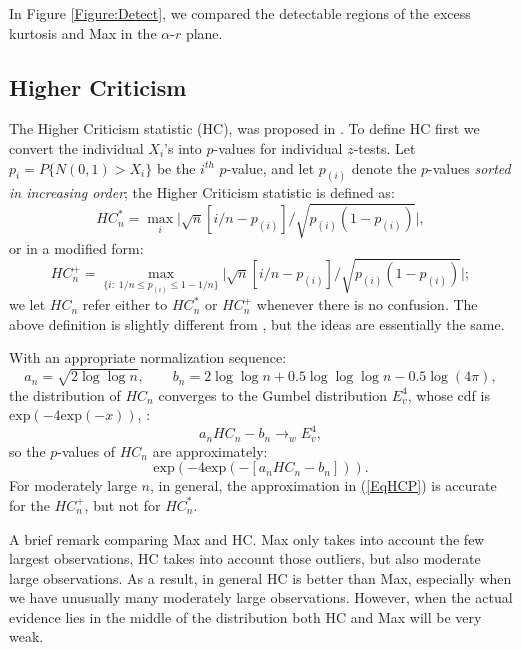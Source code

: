 In Figure \ref{Figure:Detect}, we compared the detectable regions of the excess kurtosis and Max in the $\alpha$-$r$ plane. 

\subsection{Higher Criticism}
\label{sec:HC}

The Higher Criticism statistic (HC), was proposed in \cite{gauss:lin02}. To define HC first we convert the individual $X_i$'s 
into $p$-values for individual $z$-tests. Let $p_i = P\{ N(0,1) > X_i \}$ be the $i^{th}$ $p$-value, and let $p_{(i)}$ denote 
the $p$-values {\it sorted in increasing order}; the Higher Criticism statistic is defined as:
\[
       HC_{n}^* =  \max_{i}
         \biggl| \sqrt{n} [i/n  - p_{(i)}]/ \sqrt{p_{(i)} (1-p_{(i)})} \biggr|,
\]
or in a modified form:
\[
HC_n^+  = \max_{\{i:  \; 1/n  \leq  p_{(i)} \leq  1 - 1/n \}}
         \biggl|   \sqrt{n} [i/n  - p_{(i)}]/ \sqrt{p_{(i)} (1-p_{(i)})}  \biggr|;
\]
we let $HC_n$ refer either to $HC_n^*$ or $HC_n^+$ whenever there is no confusion. The above definition is slightly 
different from \cite{gauss:lin02}, but the ideas are essentially the same.

With an appropriate normalization sequence:
\[
a_n = \sqrt{2 \log \log n}, \qquad b_n = 2 \log \log n + 0.5 \log \log \log n - 0.5 \log (4 \pi),
\]
the distribution of $HC_n$ converges to  the Gumbel distribution $E_v^4$, whose cdf is $\mathrm{exp}(-4\mathrm{exp}(-x))$, \cite{Shorack}:
\[
a_n  HC_n - b_n  \rightarrow_w  E_v^4,
\]
so the $p$-values of $HC_n$ are approximately:
\begin{equation}  
\label{EqHCP}
\mathrm{exp}(-4\mathrm{exp}( - [a_n HC_n - b_n])).
\end{equation}
For moderately large $n$, in general, the approximation in (\ref{EqHCP}) is accurate for the $HC_n^+$, but not for $HC_n^*$.   

A brief remark comparing Max and HC. Max only takes into account the few largest observations, HC takes into account those outliers, 
but also moderate large observations. As a result, in general HC is better than Max, especially when we have unusually many moderately 
large observations. However, when the actual evidence lies in the middle of the distribution both HC and Max will be very weak.


